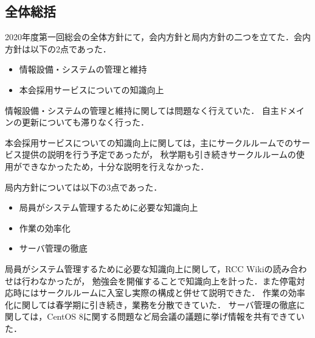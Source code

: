 \subsection*{全体総括}


2020年度第一回総会の全体方針にて，会内方針と局内方針の二つを立てた．会内方針は以下の2点であった．
\begin{itemize}
    \item 情報設備・システムの管理と維持
    \item 本会採用サービスについての知識向上
  \end{itemize}

情報設備・システムの管理と維持に関しては問題なく行えていた．
自主ドメインの更新についても滞りなく行った．

本会採用サービスについての知識向上に関しては，主にサークルルームでのサービス提供の説明を行う予定であったが，
秋学期も引き続きサークルルームの使用ができなかったため，十分な説明を行えなかった．

局内方針については以下の3点であった．
\begin{itemize}
    \item 局員がシステム管理するために必要な知識向上
    \item 作業の効率化
    \item サーバ管理の徹底
\end{itemize}

局員がシステム管理するために必要な知識向上に関して，RCC Wikiの読み合わせは行わなかったが，
勉強会を開催することで知識向上を計った．また停電対応時にはサークルルームに入室し実際の構成と併せて説明できた．
作業の効率化に関しては春学期に引き続き，業務を分散できていた．
サーバ管理の徹底に関しては，CentOS 8に関する問題など局会議の議題に挙げ情報を共有できていた．
